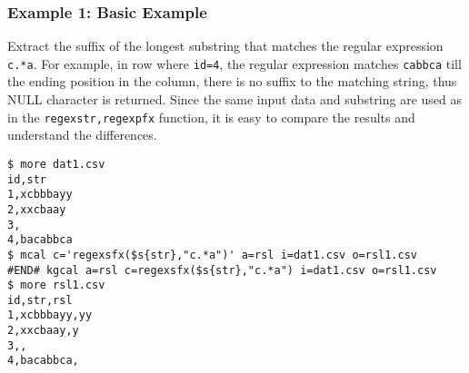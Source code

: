 \subsubsection*{Example 1: Basic Example}

Extract the suffix of the longest substring that matches the regular expression \verb|c.*a|. For example, in row where \verb|id=4|, the regular expression matches \verb|cabbca| till the ending position in the  column, there is no suffix to the matching string, thus NULL character is returned.
Since the same input data and substring are used as in the \verb|regexstr,regexpfx| function, it is easy to compare the results and understand the differences.


\begin{Verbatim}[baselinestretch=0.7,frame=single]
$ more dat1.csv
id,str
1,xcbbbayy
2,xxcbaay
3,
4,bacabbca
$ mcal c='regexsfx($s{str},"c.*a")' a=rsl i=dat1.csv o=rsl1.csv
#END# kgcal a=rsl c=regexsfx($s{str},"c.*a") i=dat1.csv o=rsl1.csv
$ more rsl1.csv
id,str,rsl
1,xcbbbayy,yy
2,xxcbaay,y
3,,
4,bacabbca,
\end{Verbatim}

